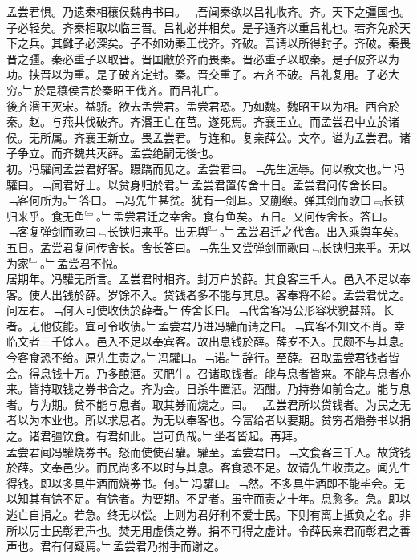 \documentclass{zhvt-classic}
\begin{document}
\hspace*{2em}孟尝君惧。乃遗秦相穰侯魏冉书曰。﹁吾闻秦欲以吕礼收齐。齐。天下之彊国也。子必轻矣。齐秦相取以临三晋。吕礼必并相矣。是子通齐以重吕礼也。若齐免於天下之兵。其雠子必深矣。子不如劝秦王伐齐。齐破。吾请以所得封子。齐破。秦畏晋之彊。秦必重子以取晋。晋国敝於齐而畏秦。晋必重子以取秦。是子破齐以为功。挟晋以为重。是子破齐定封。秦。晋交重子。若齐不破。吕礼复用。子必大穷。﹂於是穰侯言於秦昭王伐齐。而吕礼亡。\\
\hspace*{2em}後齐湣王灭宋。益骄。欲去孟尝君。孟尝君恐。乃如魏。魏昭王以为相。西合於秦。赵。与燕共伐破齐。齐湣王亡在莒。遂死焉。齐襄王立。而孟尝君中立於诸侯。无所属。齐襄王新立。畏孟尝君。与连和。复亲薛公。文卒。谥为孟尝君。诸子争立。而齐魏共灭薛。孟尝绝嗣无後也。\\
\hspace*{2em}初。冯驩闻孟尝君好客。蹑蹻而见之。孟尝君曰。﹁先生远辱。何以教文也。﹂冯驩曰。﹁闻君好士。以贫身归於君。﹂孟尝君置传舍十日。孟尝君问传舍长曰。﹁客何所为。﹂答曰。﹁冯先生甚贫。犹有一剑耳。又蒯缑。弹其剑而歌曰﹃长铗归来乎。食无鱼﹄。﹂孟尝君迁之幸舍。食有鱼矣。五日。又问传舍长。答曰。﹁客复弹剑而歌曰﹃长铗归来乎。出无舆﹄。﹂孟尝君迁之代舍。出入乘舆车矣。五日。孟尝君复问传舍长。舍长答曰。﹁先生又尝弹剑而歌曰﹃长铗归来乎。无以为家﹄。﹂孟尝君不悦。\\
\hspace*{2em}居期年。冯驩无所言。孟尝君时相齐。封万户於薛。其食客三千人。邑入不足以奉客。使人出钱於薛。岁馀不入。贷钱者多不能与其息。客奉将不给。孟尝君忧之。问左右。﹁何人可使收债於薛者。﹂传舍长曰。﹁代舍客冯公形容状貌甚辩。长者。无他伎能。宜可令收债。﹂孟尝君乃进冯驩而请之曰。﹁宾客不知文不肖。幸临文者三千馀人。邑入不足以奉宾客。故出息钱於薛。薛岁不入。民颇不与其息。今客食恐不给。原先生责之。﹂冯驩曰。﹁诺。﹂辞行。至薛。召取孟尝君钱者皆会。得息钱十万。乃多酿酒。买肥牛。召诸取钱者。能与息者皆来。不能与息者亦来。皆持取钱之券书合之。齐为会。日杀牛置酒。酒酣。乃持券如前合之。能与息者。与为期。贫不能与息者。取其券而烧之。曰。﹁孟尝君所以贷钱者。为民之无者以为本业也。所以求息者。为无以奉客也。今富给者以要期。贫穷者燔券书以捐之。诸君彊饮食。有君如此。岂可负哉。﹂坐者皆起。再拜。\\
\hspace*{2em}孟尝君闻冯驩烧券书。怒而使使召驩。驩至。孟尝君曰。﹁文食客三千人。故贷钱於薛。文奉邑少。而民尚多不以时与其息。客食恐不足。故请先生收责之。闻先生得钱。即以多具牛酒而烧券书。何。﹂冯驩曰。﹁然。不多具牛酒即不能毕会。无以知其有馀不足。有馀者。为要期。不足者。虽守而责之十年。息愈多。急。即以逃亡自捐之。若急。终无以偿。上则为君好利不爱士民。下则有离上抵负之名。非所以厉士民彰君声也。焚无用虚债之券。捐不可得之虚计。令薛民亲君而彰君之善声也。君有何疑焉。﹂孟尝君乃拊手而谢之。\\
\end{document}
